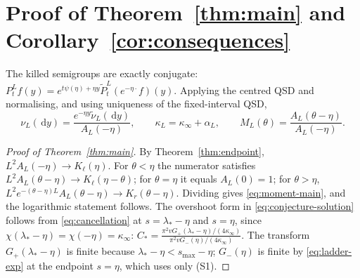 \documentclass[11pt,a4paper]{article}
\theoremstyle{definition}
\theoremstyle{remark}
\newcommand{\1}{\mathbf 1}
\newcommand{\dd}{\,\mathrm d}
\newcommand{\Kl}{K_{\ell}}
\newcommand{\Kr}{K_{r}}
\newcommand{\kinf}{\kappa_\infty}
\begin{document}
\section{Proof of Theorem~\ref{thm:main} and Corollary~\ref{cor:consequences}}\label{sec:moment-proof}
The killed semigroups are exactly conjugate: $P_t^Lf(y)=e^{t\psi(\eta)+\eta y}\widetilde P_t^L(e^{-\eta\cdot}f)(y)$. Applying the centred QSD and normalising, and using uniqueness of the fixed-interval QSD,
\begin{equation}\label{eq:qsd-tilt}
 \nu_L(\dd y)=\frac{e^{-\eta y}\widetilde\nu_L(\dd y)}{A_L(-\eta)},\qquad \kappa_L=\kinf+\alpha_L,\qquad M_L(\theta)=\frac{A_L(\theta-\eta)}{A_L(-\eta)}.
\end{equation}
\begin{proof}[Proof of Theorem~\ref{thm:main}]
By Theorem~\ref{thm:endpoint}, $L^2A_L(-\eta)\to\Kl(\eta)$. For $\theta<\eta$ the numerator satisfies $L^2A_L(\theta-\eta)\to\Kl(\eta-\theta)$; for $\theta=\eta$ it equals $A_L(0)=1$; for $\theta>\eta$, $L^2e^{-(\theta-\eta)L}A_L(\theta-\eta)\to\Kr(\theta-\eta)$. Dividing gives \eqref{eq:moment-main}, and the logarithmic statement follows. The overshoot form in \eqref{eq:conjecture-solution} follows from \eqref{eq:cancellation} at $s=\lambda_*-\eta$ and $s=\eta$, since $\chi(\lambda_*-\eta)=\chi(-\eta)=\kinf$: $C_*=\frac{\pi^2vG_+(\lambda_*-\eta)/(4\kinf)}{\pi^2vG_-(\eta)/(4\kinf)}$. The transform $G_+(\lambda_*-\eta)$ is finite because $\lambda_*-\eta<s_{\max}-\eta$; $G_-(\eta)$ is finite by \eqref{eq:ladder-exp} at the endpoint $s=\eta$, which uses only (S1).
\end{proof}
\end{document}
